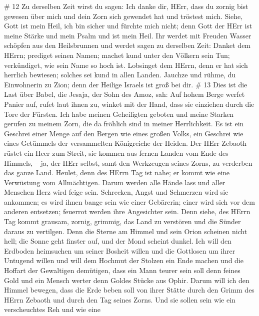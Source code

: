 \# 12  Zu derselben Zeit wirst du sagen: Ich danke dir,
HErr, dass du zornig bist gewesen über mich und dein Zorn sich gewendet
hat und tröstest mich.  Siehe, Gott ist mein Heil, ich bin
sicher und fürchte mich nicht; denn Gott der HErr ist meine Stärke und
mein Psalm und ist mein Heil.  Ihr werdet mit Freuden Wasser
schöpfen aus den Heilsbrunnen  und werdet sagen zu derselben
Zeit: Danket dem HErrn; prediget seinen Namen; machet kund unter den
Völkern sein Tun; verkündiget, wie sein Name so hoch ist. 
Lobsinget dem HErrn, denn er hat sich herrlich bewiesen; solches sei
kund in allen Landen.  Jauchze und rühme, du Einwohnerin zu
Zion; denn der Heilige Israels ist groß bei dir. \# 13  Dies
ist die Last über Babel, die Jesaja, der Sohn des Amoz, sah:
 Auf hohem Berge werfet Panier auf, rufet laut ihnen zu,
winket mit der Hand, dass sie einziehen durch die Tore der Fürsten.
 Ich habe meinen Geheiligten geboten und meine Starken
gerufen zu meinem Zorn, die da fröhlich sind in meiner Herrlichkeit.
 Es ist ein Geschrei einer Menge auf den Bergen wie eines
großen Volks, ein Geschrei wie eines Getümmels der versammelten
Königreiche der Heiden. Der HErr Zebaoth rüstet ein Heer zum Streit,
 sie kommen aus fernen Landen vom Ende des Himmels, -- ja,
der HErr selbst, samt den Werkzeugen seines Zorns, zu verderben das
ganze Land.  Heulet, denn des HErrn Tag ist nahe; er kommt
wie eine Verwüstung vom Allmächtigen.  Darum werden alle
Hände lass und aller Menschen Herz wird feige sein. 
Schrecken, Angst und Schmerzen wird sie ankommen; es wird ihnen bange
sein wie einer Gebärerin; einer wird sich vor dem anderen entsetzen;
feuerrot werden ihre Angesichter sein.  Denn siehe, des
HErrn Tag kommt grausam, zornig, grimmig, das Land zu verstören und die
Sünder daraus zu vertilgen.  Denn die Sterne am Himmel und
sein Orion scheinen nicht hell; die Sonne geht finster auf, und der Mond
scheint dunkel.  Ich will den Erdboden heimsuchen um seiner
Bosheit willen und die Gottlosen um ihrer Untugend willen und will dem
Hochmut der Stolzen ein Ende machen und die Hoffart der Gewaltigen
demütigen,  dass ein Mann teurer sein soll denn feines Gold
und ein Mensch werter denn Goldes Stücke aus Ophir.  Darum
will ich den Himmel bewegen, dass die Erde beben soll von ihrer Stätte
durch den Grimm des HErrn Zebaoth und durch den Tag seines Zorns.
 Und sie sollen sein wie ein verscheuchtes Reh und wie eine
